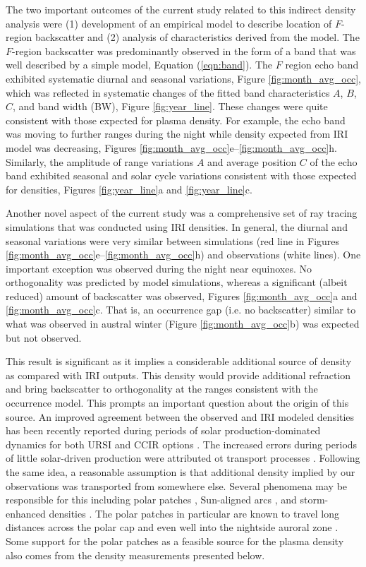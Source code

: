 The two important outcomes of the current study related to this indirect density analysis were (1) development of an empirical model to describe location of \(F\)-region backscatter and (2) analysis of characteristics derived from the model. The \(F\)-region backscatter was predominantly observed in the form of a band that was well described by a simple model, Equation (\ref{eqn:band}). The \(F\) region echo band exhibited systematic diurnal and seasonal variations, Figure \ref{fig:month_avg_occ}, which was reflected in systematic changes of the fitted band characteristics \(A\), \(B\), \(C\), and band width (BW), Figure \ref{fig:year_line}. These changes were quite consistent with those expected for plasma density. For example, the echo band was moving to further ranges during the night while density expected from IRI model was decreasing, Figures \ref{fig:month_avg_occ}e--\ref{fig:month_avg_occ}h. Similarly, the amplitude of range variations \(A\) and average position \(C\) of the echo band exhibited seasonal and solar cycle variations consistent with those expected for densities, Figures \ref{fig:year_line}a and \ref{fig:year_line}c.

Another novel aspect of the current study was a comprehensive set of ray tracing simulations that was conducted using IRI densities. In general, the diurnal and seasonal variations were very similar between simulations (red line in Figures \ref{fig:month_avg_occ}e--\ref{fig:month_avg_occ}h) and observations (white lines). One important exception was observed during the night near equinoxes. No orthogonality was predicted by model simulations, whereas a significant (albeit reduced) amount of backscatter was observed, Figures \ref{fig:month_avg_occ}a and \ref{fig:month_avg_occ}c. That is, an occurrence gap (i.e. no backscatter) similar to what was observed in austral winter (Figure \ref{fig:month_avg_occ}b) was expected but not observed.



This result is significant as it implies a considerable additional source of density as compared with IRI outputs. This density would provide additional refraction and bring backscatter to orthogonality at the ranges consistent with the occurrence model.  This prompts an important question about the origin of this source. An improved agreement between the observed and IRI modeled densities has been recently reported during periods of solar production-dominated dynamics for both URSI and CCIR options \citep{Themens2014}.  The increased errors during periods of little solar-driven production were attributed ot transport processes \citep{Themens2014}.  Following the same idea, a reasonable assumption is that additional density implied by our observations was transported from somewhere else.  Several phenomena may be responsible for this including polar patches \citep{Weber1984}, Sun-aligned arcs \citep{Valladares1994}, and storm-enhanced densities \citep{Foster1993}.  The polar patches in particular are known to travel long distances across the polar cap and even well into the nightside auroral zone \citep{Moen2007,Oksavik2010}.  Some support for the polar patches as a feasible source for the plasma density also comes from the density measurements presented below.

